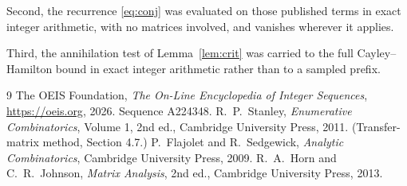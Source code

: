 \documentclass[11pt,a4paper]{article}
\theoremstyle{plain}
\theoremstyle{definition}
\begin{document}
Second, the recurrence \eqref{eq:conj} was evaluated on those published terms in exact
integer arithmetic, with no matrices involved, and vanishes wherever it applies.

Third, the annihilation test of Lemma~\ref{lem:crit} was carried to the full
Cayley--Hamilton bound in exact integer arithmetic rather than to a sampled prefix.

\begin{thebibliography}{9}
 The OEIS Foundation, \emph{The On-Line Encyclopedia of Integer
Sequences}, \url{https://oeis.org}, 2026. Sequence A224348.
 R.~P.~Stanley, \emph{Enumerative Combinatorics}, Volume 1, 2nd ed.,
Cambridge University Press, 2011. (Transfer-matrix method, Section 4.7.)
 P.~Flajolet and R.~Sedgewick, \emph{Analytic Combinatorics}, Cambridge
University Press, 2009.
 R.~A.~Horn and C.~R.~Johnson, \emph{Matrix Analysis}, 2nd ed., Cambridge
University Press, 2013.
\end{thebibliography}
\end{document}
